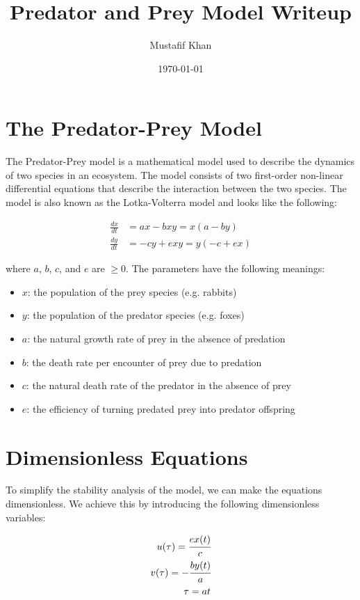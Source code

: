 \documentclass[11pt, letterpaper]{article}
\title{Predator and Prey Model Writeup}
\author{Mustafif Khan}
\date{\today}
\begin{document}
\maketitle
\newpage
\tableofcontents
\newpage
{}
\section{The Predator-Prey Model}
The Predator-Prey model is a mathematical model used to describe the
dynamics of two species in an ecosystem. The model consists of two first-order
non-linear differential equations that describe the interaction between the two
species. The model is also known as the Lotka-Volterra model and looks like the
following:

\begin{align}
    \frac{dx}{dt} & = ax - bxy = x(a-by)     \\
    \frac{dy}{dt} & = -cy + exy = y(-c + ex)
\end{align}

where $a$, $b$, $c$, and $e$ are $\geq 0$. The parameters have the
following meanings:

\begin{itemize}
    \item $x$: the population of the prey species (e.g. rabbits)
    \item $y$: the population of the predator species (e.g. foxes)
    \item $a$: the natural growth rate of prey in the absence of predation
    \item $b$: the death rate per encounter of prey due to predation
    \item $c$: the natural death rate of the predator in the absence of
          prey
    \item $e$: the efficiency of turning predated prey into predator
          offspring
\end{itemize}

\section{Dimensionless Equations}
To simplify the stability analysis of the model, we can make the equations
dimensionless. We achieve this by introducing the following dimensionless
variables:

\begin{align*}
    u (\tau) = \cfrac{ex(t)}{c}  \\
    v (\tau) = -\cfrac{by(t)}{a} \\
    \tau = at
\end{align*}
\end{document}
